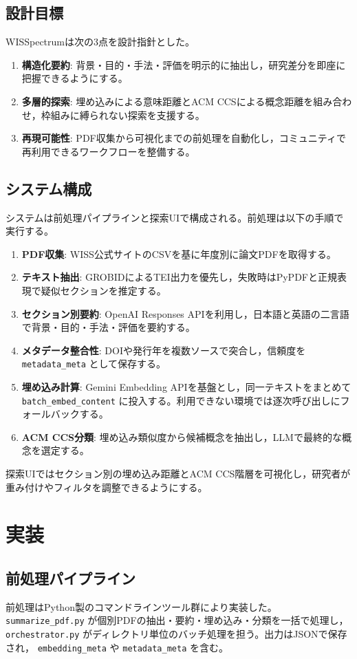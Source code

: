 \documentclass[twoside]{wiss}
\begin{document}
\subsection{設計目標}
WISSpectrumは次の3点を設計指針とした。
\begin{enumerate}
 \item \textbf{構造化要約}: 背景・目的・手法・評価を明示的に抽出し，研究差分を即座に把握できるようにする。
 \item \textbf{多層的探索}: 埋め込みによる意味距離とACM CCSによる概念距離を組み合わせ，枠組みに縛られない探索を支援する。
 \item \textbf{再現可能性}: PDF収集から可視化までの前処理を自動化し，コミュニティで再利用できるワークフローを整備する。
\end{enumerate}

\subsection{システム構成}
システムは前処理パイプラインと探索UIで構成される。前処理は以下の手順で実行する。
\begin{enumerate}
 \item \textbf{PDF収集}: WISS公式サイトのCSVを基に年度別に論文PDFを取得する。
 \item \textbf{テキスト抽出}: GROBIDによるTEI出力を優先し，失敗時はPyPDFと正規表現で疑似セクションを推定する。
 \item \textbf{セクション別要約}: OpenAI Responses APIを利用し，日本語と英語の二言語で背景・目的・手法・評価を要約する。
 \item \textbf{メタデータ整合性}: DOIや発行年を複数ソースで突合し，信頼度を \texttt{metadata\_meta} として保存する。
 \item \textbf{埋め込み計算}: Gemini Embedding APIを基盤とし，同一テキストをまとめて \texttt{batch\_embed\_content} に投入する。利用できない環境では逐次呼び出しにフォールバックする。
 \item \textbf{ACM CCS分類}: 埋め込み類似度から候補概念を抽出し，LLMで最終的な概念を選定する。
\end{enumerate}
探索UIではセクション別の埋め込み距離とACM CCS階層を可視化し，研究者が重み付けやフィルタを調整できるようにする。

\section{実装}
\subsection{前処理パイプライン}
前処理はPython製のコマンドラインツール群により実装した。 \texttt{summarize\_pdf.py} が個別PDFの抽出・要約・埋め込み・分類を一括で処理し， \texttt{orchestrator.py} がディレクトリ単位のバッチ処理を担う。出力はJSONで保存され， \texttt{embedding\_meta} や \texttt{metadata\_meta} を含む。
\end{document}
